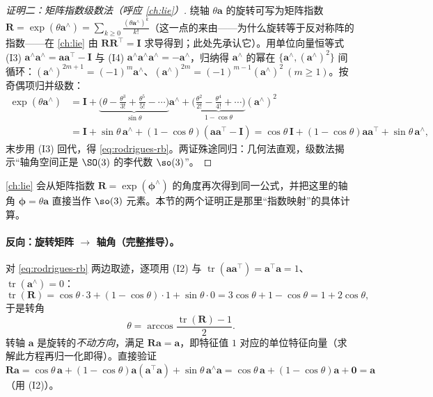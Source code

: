 \begin{proof}[证明二：矩阵指数级数法（呼应 \cref{ch:lie}）]
绕轴 $\theta\mathbf{a}$ 的旋转可写为矩阵指数 $\mathbf{R}=\exp(\theta\mathbf{a}^\wedge)=\sum_{k\ge0}\frac{(\theta\mathbf{a}^\wedge)^k}{k!}$（这一点的来由——为什么旋转等于反对称阵的指数——在 \cref{ch:lie} 由 $\mathbf{R}\mathbf{R}^\top=\mathbf{I}$ 求导得到；此处先承认它）。用单位向量恒等式 (I3) $\mathbf{a}^\wedge\mathbf{a}^\wedge=\mathbf{a}\mathbf{a}^\top-\mathbf{I}$ 与 (I4) $\mathbf{a}^\wedge\mathbf{a}^\wedge\mathbf{a}^\wedge=-\mathbf{a}^\wedge$，归纳得 $\mathbf{a}^\wedge$ 的幂在 $\{\mathbf{a}^\wedge,(\mathbf{a}^\wedge)^2\}$ 间循环：$(\mathbf{a}^\wedge)^{2m+1}=(-1)^m\mathbf{a}^\wedge$、$(\mathbf{a}^\wedge)^{2m}=(-1)^{m-1}(\mathbf{a}^\wedge)^2\ (m\ge1)$。按奇偶项归并级数：
\begin{align*}
  \exp(\theta\mathbf{a}^\wedge)
  &=\mathbf{I}+\underbrace{\Big(\theta-\tfrac{\theta^3}{3!}+\tfrac{\theta^5}{5!}-\cdots\Big)}_{\sin\theta}\mathbf{a}^\wedge
   +\underbrace{\Big(\tfrac{\theta^2}{2!}-\tfrac{\theta^4}{4!}+\cdots\Big)}_{1-\cos\theta}(\mathbf{a}^\wedge)^2\\
  &=\mathbf{I}+\sin\theta\,\mathbf{a}^\wedge+(1-\cos\theta)(\mathbf{a}\mathbf{a}^\top-\mathbf{I})
   =\cos\theta\,\mathbf{I}+(1-\cos\theta)\mathbf{a}\mathbf{a}^\top+\sin\theta\,\mathbf{a}^\wedge,
\end{align*}
末步用 (I3) 回代，得 \cref{eq:rodrigues-rb}。两证殊途同归：几何法直观，级数法揭示“轴角空间正是 $\SO(3)$ 的李代数 $\so(3)$”。
\end{proof}

\begin{note}
\cref{ch:lie} 会从矩阵指数 $\mathbf{R}=\exp(\boldsymbol{\phi}^\wedge)$ 的角度再次得到同一公式，并把这里的轴角 $\boldsymbol{\phi}=\theta\mathbf{a}$ 直接当作 $\so(3)$ 元素。本节的两个证明正是那里“指数映射”的具体计算。
\end{note}

\paragraph{反向：旋转矩阵 $\to$ 轴角（完整推导）。}对 \cref{eq:rodrigues-rb} 两边取迹，逐项用 (I2) 与 $\operatorname{tr}(\mathbf{a}\mathbf{a}^\top)=\mathbf{a}^\top\mathbf{a}=1$、$\operatorname{tr}(\mathbf{a}^\wedge)=0$：
\begin{equation}
  \operatorname{tr}(\mathbf{R})=\cos\theta\cdot3+(1-\cos\theta)\cdot1+\sin\theta\cdot0=3\cos\theta+1-\cos\theta=1+2\cos\theta,
  \label{eq:rb-tracefull}
\end{equation}
于是转角
\begin{equation}
  \theta=\arccos\frac{\operatorname{tr}(\mathbf{R})-1}{2}.
  \label{eq:rb-trace}
\end{equation}
转轴 $\mathbf{a}$ 是旋转的\emph{不动方向}，满足 $\mathbf{R}\mathbf{a}=\mathbf{a}$，即特征值 $1$ 对应的单位特征向量（求解此方程再归一化即得）。直接验证 $\mathbf{R}\mathbf{a}=\cos\theta\,\mathbf{a}+(1-\cos\theta)\mathbf{a}(\mathbf{a}^\top\mathbf{a})+\sin\theta\,\mathbf{a}^\wedge\mathbf{a}=\cos\theta\,\mathbf{a}+(1-\cos\theta)\mathbf{a}+\mathbf{0}=\mathbf{a}$（用 (I2)）。


